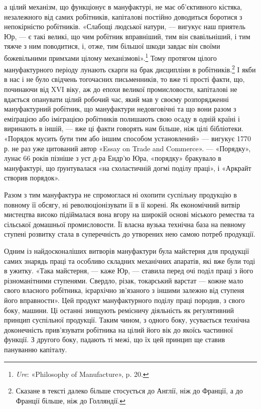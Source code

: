 \parcont{}  %
а цілий механізм, що функціонує в мануфактурі, не має об’єктивного
кістяка, незалежного від самих робітників, капіталові
постійно доводиться боротися з непокірністю робітників. «Слабощі
людської натури, — вигукує наш приятель Юр, — є такі великі,
що чим робітник вправніший, тим він свавільніший, і тим тяжче
з ним поводитися, і, отже, тим більшої шкоди завдає він своїми
божевільними примхами цілому механізмові».\footnote{
\emph{Ure}: «Philosophy of Manufacture», p. 20.
} Тому протягом
цілого мануфактурного періоду лунають скарги на брак дисципліни
в робітників.\footnote{
Сказане в тексті далеко більше стосується до Англії, ніж до Франції,
а до Франції більше, ніж до Голляндії.
} І якби в нас і не було свідчень тогочасних
письменників, то вже ті прості факти, що, починаючи від XVI віку,
аж до епохи великої промисловости, капіталові не вдається опанувати
цілий робочий час, який мав у своєму розпорядженні
мануфактурний робітник, що мануфактури недовговічні та що
вони разом з еміґрацією або іміграцією робітників полишають
свою осаду в одній країні і виринають в іншій, — вже ці факти
говорять нам більше, ніж цілі бібліотеки. «Порядок мусить бути
тим або іншим способом установлений» — вигукує 1770 р. не раз
уже цитований автор «Essay on Trade and Commerce». — «Порядку»,
лунає 66 років пізніше з уст д-ра Ендр’ю Юра, «порядку»
бракувало в мануфактурі, що ґрунтувалася «на схоластичній
догмі поділу праці», і «Аркрайт створив порядок».

Разом з тим мануфактура не спромоглася ні охопити суспільну
продукцію в повному її обсягу, ні революціонізувати її в
її корені. Як економічний витвір мистецтва високо підіймалася
вона вгору на широкій основі міського ремества та сільської домашньої
промисловости. Її власна вузька технічна база на певному
ступені розвитку стала в суперечність до утворених нею самою
потреб продукції.

Одним із найдосконаліших витворів мануфактури була майстерня
для продукції самих знарядь праці та особливо складних
механічних апаратів, які вже були тоді в ужитку. «Така майстерня,
— каже Юр, — ставила перед очі поділ праці з його різноманітними
ступенями. Свердло, різак, токарський варстат —
кожне мало свого власного робітника, ієрархічно зв’язаного з
іншими залежно від ступеня його вправности». Цей продукт
мануфактурного поділу праці породив, з свого боку, машини.
Ці останні знищують ремісничу діяльність як регулятивний
принцип суспільної продукції. Таким чином, з одного боку,
усувається технічна доконечність прив’язувати робітника на
цілий його вік до якоїсь частинної функції. З другого боку,
падають ті межі, що їх цей принцип ще ставив пануванню
капіталу.
